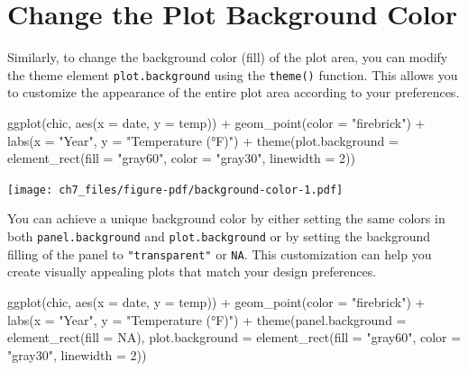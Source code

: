 \documentclass[
  letterpaper,
]{scrbook}
\newenvironment{Shaded}{\begin{snugshade}}{\end{snugshade}}
\newcommand{\AttributeTok}[1]{\textcolor[rgb]{0.40,0.45,0.13}{#1}}
\newcommand{\ConstantTok}[1]{\textcolor[rgb]{0.56,0.35,0.01}{#1}}
\newcommand{\DecValTok}[1]{\textcolor[rgb]{0.68,0.00,0.00}{#1}}
\newcommand{\FunctionTok}[1]{\textcolor[rgb]{0.28,0.35,0.67}{#1}}
\newcommand{\NormalTok}[1]{\textcolor[rgb]{0.00,0.23,0.31}{#1}}
\newcommand{\SpecialCharTok}[1]{\textcolor[rgb]{0.37,0.37,0.37}{#1}}
\newcommand{\StringTok}[1]{\textcolor[rgb]{0.13,0.47,0.30}{#1}}
\begin{document}
\section{Change the Plot Background
Color}\label{change-the-plot-background-color}

Similarly, to change the background color (fill) of the plot area, you
can modify the theme element \texttt{plot.background} using the
\texttt{theme()} function. This allows you to customize the appearance
of the entire plot area according to your preferences.

\begin{Shaded}
\begin{Highlighting}[]
\FunctionTok{ggplot}\NormalTok{(chic, }\FunctionTok{aes}\NormalTok{(}\AttributeTok{x =}\NormalTok{ date, }\AttributeTok{y =}\NormalTok{ temp)) }\SpecialCharTok{+}
  \FunctionTok{geom\_point}\NormalTok{(}\AttributeTok{color =} \StringTok{"firebrick"}\NormalTok{) }\SpecialCharTok{+}
  \FunctionTok{labs}\NormalTok{(}\AttributeTok{x =} \StringTok{"Year"}\NormalTok{, }\AttributeTok{y =} \StringTok{"Temperature (°F)"}\NormalTok{) }\SpecialCharTok{+}
  \FunctionTok{theme}\NormalTok{(}\AttributeTok{plot.background =} \FunctionTok{element\_rect}\NormalTok{(}\AttributeTok{fill =} \StringTok{"gray60"}\NormalTok{,}
                                       \AttributeTok{color =} \StringTok{"gray30"}\NormalTok{, }\AttributeTok{linewidth =} \DecValTok{2}\NormalTok{))}
\end{Highlighting}
\end{Shaded}

\texttt{[image: ch7\_files/figure-pdf/background-color-1.pdf]}

You can achieve a unique background color by either setting the same
colors in both \texttt{panel.background} and \texttt{plot.background} or
by setting the background filling of the panel to \texttt{"transparent"}
or \texttt{NA}. This customization can help you create visually
appealing plots that match your design preferences.

\begin{Shaded}
\begin{Highlighting}[]
\FunctionTok{ggplot}\NormalTok{(chic, }\FunctionTok{aes}\NormalTok{(}\AttributeTok{x =}\NormalTok{ date, }\AttributeTok{y =}\NormalTok{ temp)) }\SpecialCharTok{+}
  \FunctionTok{geom\_point}\NormalTok{(}\AttributeTok{color =} \StringTok{"firebrick"}\NormalTok{) }\SpecialCharTok{+}
  \FunctionTok{labs}\NormalTok{(}\AttributeTok{x =} \StringTok{"Year"}\NormalTok{, }\AttributeTok{y =} \StringTok{"Temperature (°F)"}\NormalTok{) }\SpecialCharTok{+}
  \FunctionTok{theme}\NormalTok{(}\AttributeTok{panel.background =} \FunctionTok{element\_rect}\NormalTok{(}\AttributeTok{fill =} \ConstantTok{NA}\NormalTok{),}
        \AttributeTok{plot.background =} \FunctionTok{element\_rect}\NormalTok{(}\AttributeTok{fill =} \StringTok{"gray60"}\NormalTok{,}
                                       \AttributeTok{color =} \StringTok{"gray30"}\NormalTok{, }\AttributeTok{linewidth =} \DecValTok{2}\NormalTok{))}
\end{Highlighting}
\end{Shaded}
\end{document}
